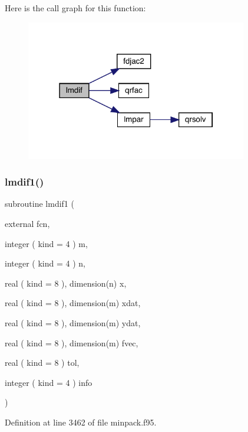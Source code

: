 Here is the call graph for this function\+:\nopagebreak
\begin{figure}[H]
\begin{center}
\leavevmode
\includegraphics[width=274pt]{minpack_8f95_a4689c4ce455cf0795081e88c004b48ff_cgraph}
\end{center}
\end{figure}
\mbox{\label{minpack_8f95_a700bf6f1bdcace537df37252fd26c723}} 
\subsubsection{\texorpdfstring{lmdif1()}{lmdif1()}}
{\footnotesize\ttfamily subroutine lmdif1 (\begin{DoxyParamCaption}\item[{external}]{fcn,  }\item[{integer ( kind = 4 )}]{m,  }\item[{integer ( kind = 4 )}]{n,  }\item[{real ( kind = 8 ), dimension(n)}]{x,  }\item[{real ( kind = 8 ), dimension(m)}]{xdat,  }\item[{real ( kind = 8 ), dimension(m)}]{ydat,  }\item[{real ( kind = 8 ), dimension(m)}]{fvec,  }\item[{real ( kind = 8 )}]{tol,  }\item[{integer ( kind = 4 )}]{info }\end{DoxyParamCaption})}



Definition at line 3462 of file minpack.\+f95.

